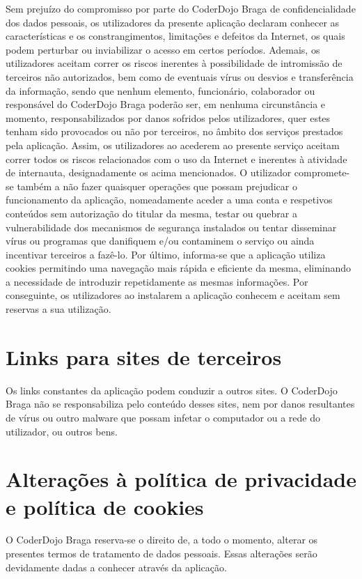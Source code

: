 \documentclass[11pt]{article}
\begin{document}
Sem prejuízo do compromisso por parte do CoderDojo Braga de
confidencialidade dos dados pessoais, os utilizadores da presente
aplicação declaram conhecer as características e os
constrangimentos, limitações e defeitos da Internet, os quais podem
perturbar ou inviabilizar o acesso em certos períodos.
Ademais, os utilizadores aceitam correr os riscos inerentes à
possibilidade de intromissão de terceiros não autorizados, bem como
de eventuais vírus ou desvios e transferência da informação, sendo
que nenhum elemento, funcionário, colaborador ou responsável do
CoderDojo Braga poderão ser, em nenhuma circunstância e momento,
responsabilizados por danos sofridos pelos utilizadores, quer estes
tenham sido provocados ou não por terceiros, no âmbito dos serviços
prestados pela aplicação.
Assim, os utilizadores ao acederem ao presente serviço aceitam
correr todos os riscos relacionados com o uso da Internet e inerentes
à atividade de internauta, designadamente os acima mencionados.
O utilizador compromete-se também a não fazer quaisquer operações
que possam prejudicar o funcionamento da aplicação, nomeadamente
aceder a uma conta e respetivos conteúdos sem autorização do
titular da mesma, testar ou quebrar a vulnerabilidade dos
mecanismos de segurança instalados ou tentar disseminar vírus ou
programas que danifiquem e/ou contaminem o serviço ou ainda
incentivar terceiros a fazê-lo.
Por último, informa-se que a aplicação utiliza cookies permitindo uma
navegação mais rápida e eficiente da mesma, eliminando a
necessidade de introduzir repetidamente as mesmas informações. Por
conseguinte, os utilizadores ao instalarem a aplicação conhecem e
aceitam sem reservas a sua utilização.

\section{Links para sites de terceiros}

Os links constantes da aplicação podem conduzir a outros sites. O
CoderDojo Braga não se responsabiliza pelo conteúdo desses sites, nem por
danos resultantes de vírus ou outro malware que possam infetar o
computador ou a rede do utilizador, ou outros bens.

\section{Alterações à política de privacidade e política de
cookies}

O CoderDojo Braga reserva-se o direito de, a todo o momento, alterar os
presentes termos de tratamento de dados pessoais. Essas alterações
serão devidamente dadas a conhecer através da aplicação.
\end{document}
